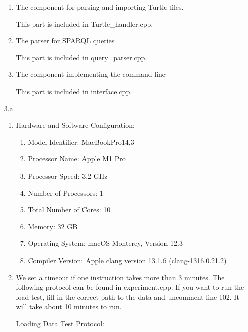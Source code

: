 \documentclass{article}
\begin{document}
\begin{enumerate}
\begin{enumerate}
\item The component for parsing and importing Turtle files.

This part is included in Turtle\_handler.cpp. 

\item The parser for SPARQL queries

This part is included in query\_parser.cpp. 

\item The component implementing the command line

This part is included in interface.cpp.

\end{enumerate}
\newpage
\item[3.a]
\begin{enumerate}
\item Hardware and Software Configuration:

\begin{enumerate}
\item Model Identifier:	MacBookPro14,3

\item Processor Name:	Apple M1 Pro

\item Processor Speed:	3.2 GHz

\item Number of Processors:	1

\item Total Number of Cores:	10

\item Memory:	32 GB

\item Operating System: macOS Monterey, Version 12.3

\item Compiler Version: Apple clang version 13.1.6 (clang-1316.0.21.2)

\end{enumerate}

\item 

We set a timeout if one instruction takes more than 3 minutes. The following protocol can be found in experiment.cpp. If you want to run the load test, fill in the correct path to the data and uncomment line 102. It will take about 10 minutes to run. 

Loading Data Test Protocol:


\end{enumerate}
\end{enumerate}
\end{document}
